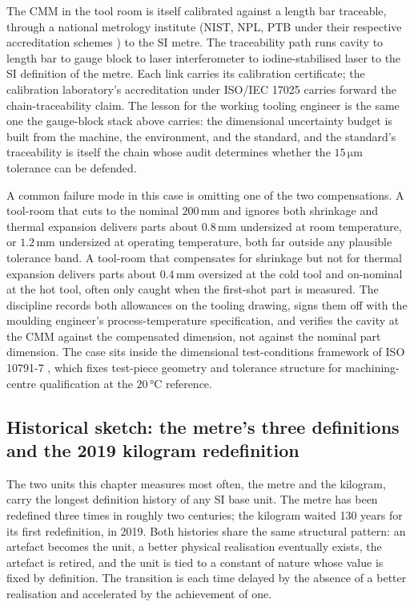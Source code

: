 The CMM in the tool room is itself calibrated against a length bar
traceable, through a national metrology institute (NIST, NPL, PTB
under their respective accreditation schemes
\cite{ch07t3-std:iso-iec-17025-2017}) to the SI metre. The
traceability path runs cavity to length bar to gauge block to laser
interferometer to iodine-stabilised laser to the SI definition of
the metre. Each link carries its calibration certificate; the
calibration laboratory's accreditation under ISO/IEC 17025
\cite{ch07t3-std:iso-iec-17025-2017} carries forward the
chain-traceability claim. The lesson for the working tooling
engineer is the same one the gauge-block stack above carries: the
dimensional uncertainty budget is built from the machine, the
environment, and the standard, and the standard's traceability is
itself the chain whose audit determines whether the $15 \,\si
{\micro\meter}$ tolerance can be defended.

A common failure mode in this case is omitting one of the two
compensations. A tool-room that cuts to the nominal $200 \,\si
{\milli\meter}$ and ignores both shrinkage and thermal expansion
delivers parts about $0.8 \,\si{\milli\meter}$ undersized at room
temperature, or $1.2 \,\si{\milli\meter}$ undersized at operating
temperature, both far outside any plausible tolerance band. A
tool-room that compensates for shrinkage but not for thermal
expansion delivers parts about $0.4 \,\si{\milli\meter}$ oversized
at the cold tool and on-nominal at the hot tool, often only caught
when the first-shot part is measured. The discipline records both
allowances on the tooling drawing, signs them off with the moulding
engineer's process-temperature specification, and verifies the
cavity at the CMM against the compensated dimension, not against
the nominal part dimension. The case sits inside the dimensional
test-conditions framework of ISO 10791-7 \cite{ch07t3-std:iso-10791-7-2014},
which fixes test-piece geometry and tolerance structure for
machining-centre qualification at the $20 \,\si{\degreeCelsius}$
reference.

\subsection*{Historical sketch: the metre's three definitions and
the 2019 kilogram redefinition}

The two units this chapter measures most often, the metre and the
kilogram, carry the longest definition history of any SI base unit.
The metre has been redefined three times in roughly two centuries;
the kilogram waited 130 years for its first redefinition, in 2019.
Both histories share the same structural pattern: an artefact
becomes the unit, a better physical realisation eventually exists,
the artefact is retired, and the unit is tied to a constant of
nature whose value is fixed by definition. The transition is each
time delayed by the absence of a better realisation and accelerated
by the achievement of one.

